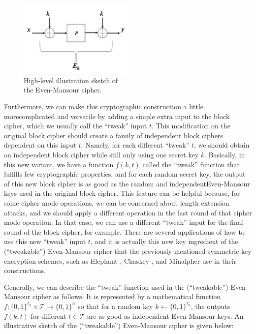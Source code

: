 \documentclass[12pt]{article}
\begin{document}
    \begin{figure}[ht]
        \captionsetup{justification=centering}
        \centering
        \includegraphics[width=0.5\textwidth]{figures/images/img-1.pdf}
        \caption{High-level illustration sketch of\\ the Even-Mansour cipher.}
    \end{figure}
    
    \noindent Furthermore, we can make this cryptographic construction a little more\break complicated and versatile by adding a simple extra input to the block cipher, which we usually call the ``tweak'' input $t$. This modification on the original block cipher should create a family of independent block ciphers dependent on this input $t$. Namely, for each different ``tweak'' $t$, we should obtain an independent block cipher while still only using one secret key $k$. Basically, in this new variant, we have a function $f(k,t)$ called the ``tweak'' function that fulfills few cryptographic properties, and for each random secret key, the output of this new block cipher is as good as the random and independent\break Even-Mansour keys used in the original block cipher. This feature can be helpful because, for some cipher mode operations, we can be concerned about length extension attacks, and we should apply a different operation in the last round of that cipher mode operation. In that case, we can use a different ``tweak'' input for the final round of the block cipher, for example. There are several applications of how to use this new ``tweak'' input $t$, and it is actually this new key ingredient of the (``tweakable'') Even-Mansour cipher that the previously mentioned symmetric key encryption schemes, such as Elephant \cite{beyne-chen-dobraunig-mennink:dumbo-jumbo-delirium-parallel-authenticated-encryption-lightweight-circus:2020:03-2024}, Chaskey \cite{mouha-et-al:chaskey-efficient-mac-algorithm-32-bit-microcontrollers:2014:03-2024}, and Minalpher \cite{sasaki-et-al:minalpher-v1:2014:03-2024} use in their constructions.

    \noindent Generally, we can describe the  ``tweak'' function used in the (``tweakable'') Even-Mansour cipher as follows. It is represented by a mathematical function $f: {\{0, 1 \}}^{{\ell}_{k}} \times \mathcal{T} \rightarrow {\{0, 1 \}}^{n}$ so that for a random key $k \leftarrow {\{0, 1 \}}^{{\ell}_{k}}$, the outputs $f(k, t)$ for different $t \in \mathcal{T}$ are as good as independent Even-Mansour keys. An illustrative sketch of the (``tweakable'') Even-Mansour cipher is given below:
\end{document}
